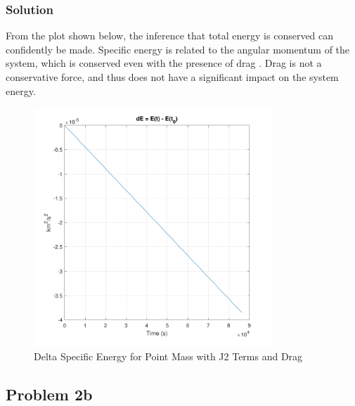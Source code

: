 \documentclass[conf]{new-aiaa}
\begin{document}

\subsubsection*{Solution} 

From the plot shown below, the inference that total energy is conserved can confidently be made. Specific energy is related to the angular momentum of the system, which is conserved even with the presence of drag \cite{jah_mod3}. Drag is not a conservative force, and thus does not have a significant impact on the system energy. 

\begin{figure}[H]
	\centering
	\includegraphics[width=0.8\textwidth]{Problem 2a - Delta Specific Energy.pdf}
	\caption{Delta Specific Energy for Point Mass with J2 Terms and Drag}
\end{figure}



\newpage

\subsection*{Problem 2b} 

\begin{center}
	 \\
\end{center}
\end{document}
